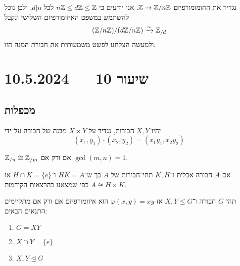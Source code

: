 \begin{example}
	נגדיר את ההומומורפיזם $\mathbb{Z} \to \mathbb{Z} / n\mathbb{Z}$. אנו יודעים כי $n \mathbb{Z} \le d \mathbb{Z} \le \mathbb{Z}$ לכל $d \big| n$, ולכן נוכל להשתמש במשפט האיזומורפיזם השלישי ונקבל
	\[
		(\mathbb{Z}/n\mathbb{Z})/(d\mathbb{Z}/n\mathbb{Z}) \xrightarrow{\sim} \mathbb{Z}_{/d}
	\]
	ולמעשה הצלחנו לפשט משמעותית את חבורת המנה הזו.
\end{example}

\section{שיעור 10 --- 10.5.2024}
\subsection{מכפלות}
\begin{definition}
	יהיו $X, Y$ חבורות, נגדיר על $X \times Y$ מבנה של חבורה על־ידי
	\[
		(x_1, y_1) \cdot (x_2, y_2) = (x_1 y_1, x_2 y_2)
	\]
\end{definition}
\begin{example}
	$\mathbb{Z}_{/n} \cong \mathbb{Z}_{/m}$ אם ורק אם $\gcd(m, n) = 1$.
\end{example}
\begin{example}
	אם $A$ חבורה אבלית ו־$K, H$ תתי־חבורות של $A$ כך ש־$HK = A$ ו־$H \cap K = \{e\}$ אז $A \cong H \times K$ כפי שמצאנו בהרצאות הקודמות.
\end{example}
\begin{theorem}
	תהי $G$ חבורה ו־$X, Y \le G$ אז $\varphi(x, y) = xy$ הוא איזומורפיזם אם ורק אם מתקיימים התנאים הבאים:
	\begin{enumerate}
		\item $G = XY$
		\item $X \cap Y = \{e\}$
		\item $X, Y \trianglelefteq G$
	\end{enumerate}
\end{theorem}
